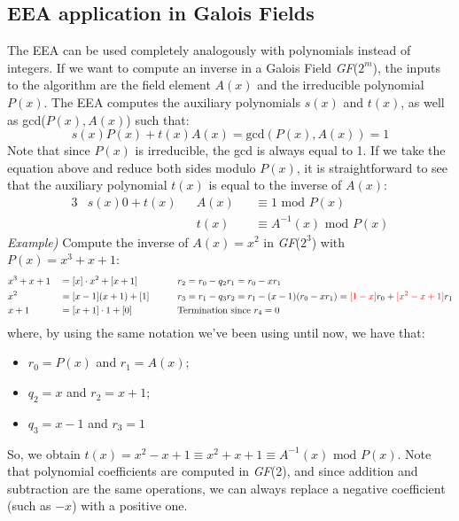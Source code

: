 \documentclass[11pt, a4paper]{article}
\newcommand{\gf}[1]{\textit{GF}(#1)}
\newcommand{\mymod}{
    \text{ mod }
}
\begin{document}
\subsection{EEA application in Galois Fields}
The EEA can be used completely analogously with polynomials instead of integers. If we want to compute an inverse in a Galois Field \gf{$2^m$}, the inputs to the algorithm are the field element $A(x)$ and the irreducible polynomial $P(x)$. The EEA computes the auxiliary polynomials $s(x)$ and $t(x)$, as well as gcd($P(x),A(x)$) such that:
$$s(x)P(x)+t(x)A(x)=\text{gcd}(P(x),A(x))=1$$
Note that since $P(x)$ is irreducible, the gcd is always equal to 1. If we take the equation above and reduce both sides modulo $P(x)$, it is straightforward to see that the auxiliary polynomial $t(x)$ is equal to the inverse of $A(x)$:
\begin{alignat*}{3}
    &s(x)0+t(x)&&A(x)&&\equiv 1\mymod P(x)\\
    &&&t(x)&&\equiv A^{-1}(x)\mymod P(x)
\end{alignat*}
\textit{Example)} Compute the inverse of $A(x)=x^2$ in \gf{$2^3$} with $P(x)=x^3+x+1$:
\begin{alignat*}{3}
    &x^3+x+1&&=[x]\cdot x^2+[x+1]\qquad &&r_2=r_0-q_2r_1=r_0-xr_1\\
    &x^2&&=[x-1](x+1)+[1]\qquad &&r_3=r_1-q_3r_2=r_1-(x-1)(r_0-xr_1)=\textcolor{red}{[1-x]}r_0+\textcolor{red}{[x^2-x+1]}r_1\\
    &x+1&&=[x+1]\cdot1+[0]\qquad&&\text{Termination since $r_4=0$}
\end{alignat*}
where, by using the same notation we've been using until now, we have that:
\begin{itemize}
    \item $r_0=P(x)$ and $r_1=A(x)$;
    \item $q_2=x$ and $r_2=x+1$;
    \item $q_3=x-1$ and $r_3=1$
\end{itemize}
So, we obtain $t(x)=x^2-x+1\equiv x^2+x+1\equiv A^{-1}(x)\mymod P(x)$. Note that polynomial coefficients are computed in \gf{2}, and since addition and subtraction are the same operations, we can always replace a negative coefficient (such as $-x$) with a positive one.

\newpage
\end{document}
